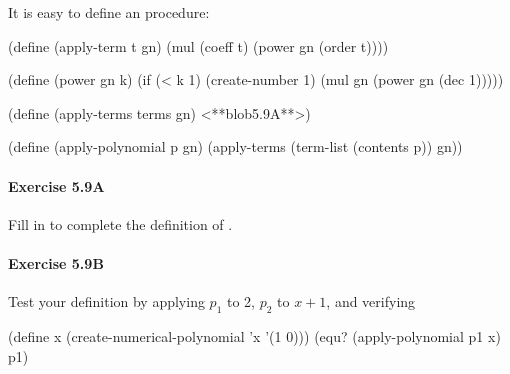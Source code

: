 It is easy to define an  procedure:

\beginlisp
(define (apply-term t gn)
  (mul (coeff t)
       (power gn (order t))))
\endlisp

\beginlisp
(define (power gn k)
  (if (< k 1)
      (create-number 1)
      (mul gn (power gn (dec 1)))))
\endlisp

\beginlisp
(define (apply-terms terms gn)
  <**blob5.9A**>)
\endlisp

\beginlisp
(define (apply-polynomial p gn)
  (apply-terms
   (term-list (contents p))
   gn))
\endlisp

\paragraph{Exercise 5.9A}
Fill in   to complete the definition of .

\paragraph{Exercise 5.9B}
Test your definition by applying $p_1$ to 2, $p_2$ to $x+1$, and verifying

\beginlisp
(define x (create-numerical-polynomial 'x '(1 0)))
(equ? (apply-polynomial p1 x) p1)
\endlisp





